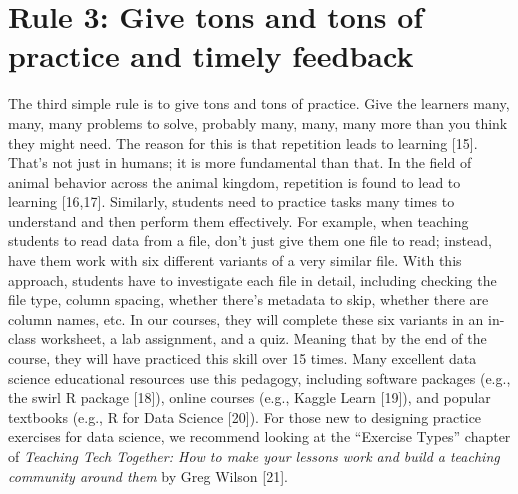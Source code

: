 \documentclass[
  10pt,
  letterpaper,
]{article}
\begin{document}
\section{Rule 3: Give tons and tons of practice and timely
feedback}\label{sec-rule3}

The third simple rule is to give tons and tons of practice. Give the
learners many, many, many problems to solve, probably many, many, many
more than you think they might need. The reason for this is that
repetition leads to learning {[}15{]}. That's not just in humans; it is
more fundamental than that. In the field of animal behavior across the
animal kingdom, repetition is found to lead to learning {[}16,17{]}.
Similarly, students need to practice tasks many times to understand and
then perform them effectively. For example, when teaching students to
read data from a file, don't just give them one file to read; instead,
have them work with six different variants of a very similar file. With
this approach, students have to investigate each file in detail,
including checking the file type, column spacing, whether there's
metadata to skip, whether there are column names, etc. In our courses,
they will complete these six variants in an in-class worksheet, a lab
assignment, and a quiz. Meaning that by the end of the course, they will
have practiced this skill over 15 times. Many excellent data science
educational resources use this pedagogy, including software packages
(e.g., the swirl R package {[}18{]}), online courses (e.g., Kaggle Learn
{[}19{]}), and popular textbooks (e.g., R for Data Science {[}20{]}).
For those new to designing practice exercises for data science, we
recommend looking at the ``Exercise Types'' chapter of \emph{Teaching
Tech Together: How to make your lessons work and build a teaching
community around them} by Greg Wilson {[}21{]}.
\end{document}
